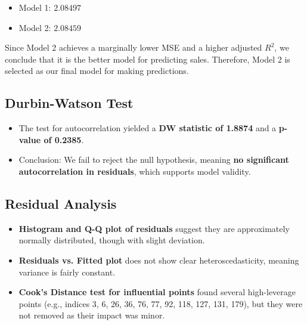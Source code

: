 \documentclass{article}
\begin{document}
\begin{itemize}
    \item Model 1: $2.08497$
    \item Model 2: $2.08459$
\end{itemize}

Since Model 2 achieves a marginally lower MSE and a higher adjusted $R^2$, we conclude that it is the better model for predicting sales. Therefore, Model 2 is selected as our final model for making predictions.

\subsection{Durbin-Watson Test}
\begin{itemize}
    \item The test for autocorrelation yielded a \textbf{DW statistic of 1.8874} and a \textbf{p-value of 0.2385}.
    \item Conclusion: We fail to reject the null hypothesis, meaning \textbf{no significant autocorrelation in residuals}, which supports model validity.
\end{itemize}

\subsection{Residual Analysis}
\begin{itemize}
    \item \textbf{Histogram and Q-Q plot of residuals} suggest they are approximately normally distributed, though with slight deviation.
    \item \textbf{Residuals vs. Fitted plot} does not show clear heteroscedasticity, meaning variance is fairly constant.
    \item \textbf{Cook’s Distance test for influential points} found several high-leverage points (e.g., indices 3, 6, 26, 36, 76, 77, 92, 118, 127, 131, 179), but they were not removed as their impact was minor.
\end{itemize}

\end{document}
